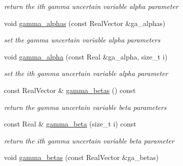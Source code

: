 \begin{DoxyCompactItemize}
\begin{DoxyCompactList}\small\item\em return the ith gamma uncertain variable alpha parameter \end{DoxyCompactList}\item 
void \hyperlink{classPecos_1_1AleatoryDistParams_a06620a83ad676ac76c0fea68dae9c090}{gamma\+\_\+alphas} (const Real\+Vector \&ga\+\_\+alphas)\label{classPecos_1_1AleatoryDistParams_a06620a83ad676ac76c0fea68dae9c090}

\begin{DoxyCompactList}\small\item\em set the gamma uncertain variable alpha parameters \end{DoxyCompactList}\item 
void \hyperlink{classPecos_1_1AleatoryDistParams_aeab0575b5da7d7b1920c9dcd08fe4287}{gamma\+\_\+alpha} (const Real \&ga\+\_\+alpha, size\+\_\+t i)\label{classPecos_1_1AleatoryDistParams_aeab0575b5da7d7b1920c9dcd08fe4287}

\begin{DoxyCompactList}\small\item\em set the ith gamma uncertain variable alpha parameter \end{DoxyCompactList}\item 
const Real\+Vector \& \hyperlink{classPecos_1_1AleatoryDistParams_a620c8945c54f8557a266c0f260c9db12}{gamma\+\_\+betas} () const \label{classPecos_1_1AleatoryDistParams_a620c8945c54f8557a266c0f260c9db12}

\begin{DoxyCompactList}\small\item\em return the gamma uncertain variable beta parameters \end{DoxyCompactList}\item 
const Real \& \hyperlink{classPecos_1_1AleatoryDistParams_ab3264d444267d4914ec627220f06ec5d}{gamma\+\_\+beta} (size\+\_\+t i) const \label{classPecos_1_1AleatoryDistParams_ab3264d444267d4914ec627220f06ec5d}

\begin{DoxyCompactList}\small\item\em return the ith gamma uncertain variable beta parameter \end{DoxyCompactList}\item 
void \hyperlink{classPecos_1_1AleatoryDistParams_a79c480a38e19b71b4b62db0e29bb63aa}{gamma\+\_\+betas} (const Real\+Vector \&ga\+\_\+betas)\label{classPecos_1_1AleatoryDistParams_a79c480a38e19b71b4b62db0e29bb63aa}


\end{DoxyCompactItemize}
